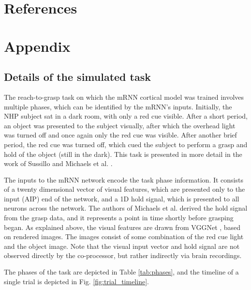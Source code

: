 \documentclass[12pt]{iopart}
\begin{document}
\section*{References}



\newpage

\section{Appendix}
\subsection{Details of the simulated task}
\label{sup:michaelstask}

The reach-to-grasp task on which the mRNN cortical model was trained involves multiple phases, which can be identified by the
mRNN's inputs. Initially, the NHP subject sat in a dark room, with only a red cue visible. After a short period,
an object was presented to the subject visually, after which the overhead light was turned off and once again
only the red cue was visible. After another brief period, the red cue was turned off, which cued the subject
to perform a grasp and hold of the object (still in the dark). This task is presented in more detail in the
work of Sussillo \cite{sussillo.mrnn} and Michaels et al. \cite{michaels.mrnn}.

The inputs to the mRNN network encode the task phase information. It consists of a twenty dimensional vector
of visual features, which are presented only to the input (AIP) end of the network, and a 1D hold signal,
which is presented to all neurons across the network. The authors of Michaels et al. \cite{michaels.mrnn}
derived the hold signal from the grasp data, and it represents a point in time shortly before grasping began.
As explained above, the visual features are drawn from VGGNet \cite{simonyan.vgg}, based on rendered images.
The images consist of some combination of the red cue light and the object image. Note that the visual input
vector and hold signal are not observed directly by the co-processor, but rather indirectly via brain
recordings.

The phases of the task are depicted in Table \ref{tab:phases}, and the timeline of a single trial is
depicted in Fig. \ref{fig:trial_timeline}.
\end{document}

